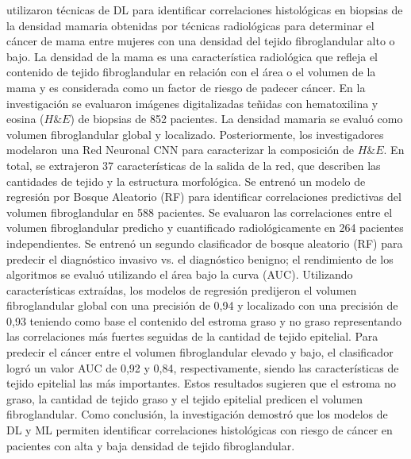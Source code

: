 \citep{Mullooly2019} utilizaron técnicas de DL para identificar correlaciones histológicas en biopsias de la densidad mamaria obtenidas por técnicas radiológicas para determinar el cáncer de mama entre mujeres con una densidad del tejido fibroglandular alto o bajo. La densidad de la mama es una característica radiológica que refleja el contenido de tejido fibroglandular en relación con el área o el volumen de la mama y es considerada como un factor de riesgo de padecer cáncer. En la investigación se evaluaron imágenes digitalizadas teñidas con hematoxilina y eosina ($H\&E$) de biopsias de 852 pacientes. La densidad mamaria se evaluó como volumen fibroglandular global y localizado. Posteriormente, los investigadores modelaron una Red Neuronal CNN para caracterizar la composición de $H\&E$. En total, se extrajeron 37 características de la salida de la red, que describen las cantidades de tejido y la estructura morfológica. Se entrenó un modelo de regresión por Bosque Aleatorio (RF) para identificar correlaciones predictivas del volumen fibroglandular en 588 pacientes. Se evaluaron las correlaciones entre el volumen fibroglandular predicho y cuantificado radiológicamente en 264 pacientes independientes. Se entrenó un segundo clasificador de bosque aleatorio (RF) para predecir el diagnóstico invasivo vs. el diagnóstico benigno; el rendimiento de los algoritmos se evaluó utilizando el área bajo la curva (AUC). Utilizando características extraídas, los modelos de regresión predijeron el volumen fibroglandular global con una precisión de 0,94 y localizado con una precisión de 0,93 teniendo como base el contenido del estroma graso y no graso representando las correlaciones más fuertes seguidas de la cantidad de tejido epitelial. Para predecir el cáncer entre el volumen fibroglandular elevado y bajo, el clasificador logró un valor AUC de 0,92 y 0,84, respectivamente, siendo las características de tejido epitelial las más importantes. Estos resultados sugieren que el estroma no graso, la cantidad de tejido graso y el tejido epitelial predicen el volumen fibroglandular. Como conclusión, la investigación demostró que los modelos de DL y ML permiten identificar correlaciones histológicas con riesgo de cáncer en pacientes con alta y baja densidad de tejido fibroglandular.

